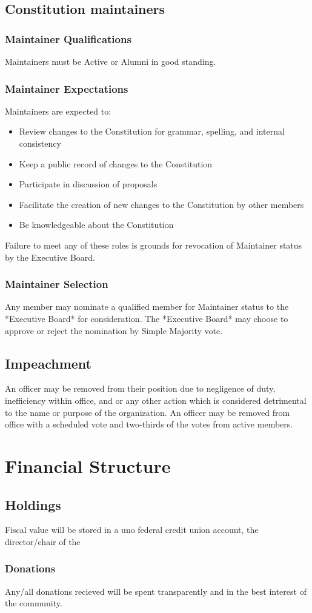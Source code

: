 \documentclass{article}
\newcommand{\article}[1]{\section{#1} \label{#1}}
\newcommand{\asection}[1]{\subsection{#1} \label{#1}}
\newcommand{\asubsection}[1]{\subsubsection{#1} \label{#1}}
\begin{document}
\asection{Constitution maintainers}

\asubsection{Maintainer Qualifications}
Maintainers must be Active or Alumni in good standing.

\asubsection{Maintainer Expectations}
Maintainers are expected to:
\begin{itemize}
	\item Review changes to the Constitution for grammar, spelling, and internal consistency
	\item Keep a public record of changes to the Constitution
	\item Participate in discussion of proposals
	\item Facilitate the creation of new changes to the Constitution by other members
	\item Be knowledgeable about the Constitution
\end{itemize}
Failure to meet any of these roles is grounds for revocation of Maintainer status by the Executive Board.

\asubsection{Maintainer Selection}
Any member may nominate a qualified member for Maintainer status to the *Executive Board* for consideration.
The *Executive Board* may choose to approve or reject the nomination by Simple Majority vote.
\asection{Impeachment}
An officer may be removed from their position due to negligence of duty, inefficiency within office, and or any other action which is considered detrimental to the name or purpose of the organization. An officer may be removed from office with a scheduled vote and two-thirds of the votes from active members.


\article{Financial Structure}
\asection{Holdings}
Fiscal value will be stored in a uno federal credit union account, the director/chair of the %
\asubsection{Donations}
Any/all donations recieved will be spent transparently and in the best interest of the community.
\end{document}
